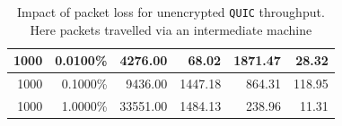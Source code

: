 \documentclass[12pt,a4paper]{report}
\begin{document}
\begin{table}[H]
\begin{tabular}{|r|r|r|r|r|r|}
1000                                                                                            & 0.0100\%                                                                                             & 4276.00                                                                                               & 68.02                                                                                                                               & 1871.47                                                                                                                                    & 28.32                                                                                                                             \\ \hline
1000                                                                                            & 0.1000\%                                                                                             & 9436.00                                                                                               & 1447.18                                                                                                                             & 864.31                                                                                                                                     & 118.95                                                                                                                            \\ \hline
1000                                                                                            & 1.0000\%                                                                                             & 33551.00                                                                                              & 1484.13                                                                                                                             & 238.96                                                                                                                                     & 11.31                                                                                                                             \\ \hline
\end{tabular}
 \centering
    \caption[Impact of packet loss for unencrypted \texttt{QUIC} throughput]{Impact of packet loss for unencrypted \texttt{QUIC} throughput. Here packets travelled via an intermediate machine}
    \label{fig:unencrypted_QUIC_throughput_via_B_with_packet_loss}
\end{table}
\end{document}
